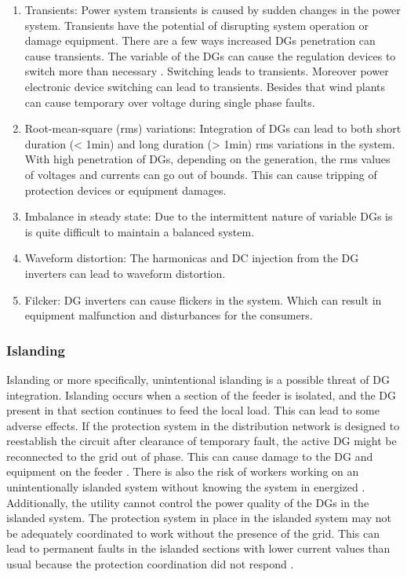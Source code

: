 \begin{enumerate}
    \item Transients: Power system transients is caused by sudden changes in the power system. Transients have the potential of disrupting system operation or damage equipment. There are a few ways increased DGs penetration can cause transients. The variable of the DGs can cause the regulation devices to switch more than necessary \cite{SUNGRIN}. Switching leads to transients. Moreover power electronic device switching can lead to transients. Besides that wind plants can cause temporary over voltage during single phase faults.
    \item Root-mean-square (rms) variations: Integration of DGs can lead to both short duration (< 1min) and long duration (> 1min) rms variations in the system. With high penetration of DGs, depending on the generation, the rms values of voltages and currents can go out of bounds. This can cause tripping of protection devices or equipment damages.  
    \item Imbalance in steady state: Due to the intermittent nature of variable DGs is is quite difficult to maintain a balanced system.
    \item Waveform distortion: The harmonicas and DC injection from the DG inverters can lead to waveform distortion.
    \item Filcker: DG inverters can cause flickers in the system. Which can result in equipment malfunction and disturbances for the consumers.
    
\end{enumerate}

\subsubsection{Islanding}
Islanding or more specifically, unintentional islanding is a possible threat of DG integration. Islanding occurs when a section of the feeder is isolated, and the DG present in that section continues to feed the local load. This can lead to some adverse effects. If the protection system in the distribution network is designed to reestablish the circuit after clearance of temporary fault, the active DG might be reconnected to the grid out of phase. This can cause damage to the DG and equipment on the feeder \cite{ILAND_1}. There is also the risk of workers working on an unintentionally islanded system without knowing the system in energized \cite{ILAND_1}. Additionally, the utility cannot control the power quality of the DGs in the islanded system. The protection system in place in the islanded system may not be adequately coordinated to work without the presence of the grid. This can lead to permanent faults in the islanded sections with lower current values than usual because the protection coordination did not respond \cite{ILAND_2}.

